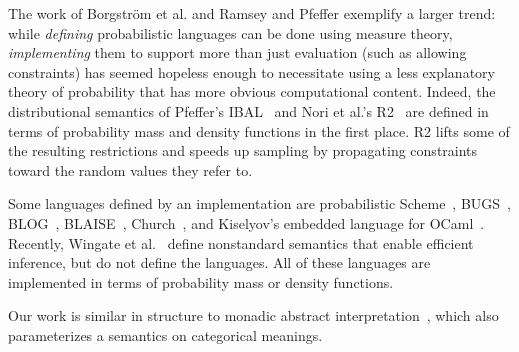 \documentclass{llncs}
\begin{document}
The work of Borgstr\"om et al. and Ramsey and Pfeffer exemplify a larger trend: while \emph{defining} probabilistic languages can be done using measure theory, \emph{implementing} them to support more than just evaluation (such as allowing constraints) has seemed hopeless enough to necessitate using a less explanatory theory of probability that has more obvious computational content.
Indeed, the distributional semantics of Pfeffer's IBAL~\cite{cit:pfeffer-2007chapter-ibal} and Nori et al.'s R2~\cite{cit:nori-2014aaai-preimage} are defined in terms of probability mass and density functions in the first place.
R2 lifts some of the resulting restrictions and speeds up sampling by propagating constraints toward the random values they refer to.

Some languages defined by an implementation are probabilistic Scheme~\cite{cit:koller-1997aaai-bayes-programs-short}, BUGS~\cite{cit:winbugs-language-short}, BLOG~\cite{cit:blog-language-short}, BLAISE~\cite{cit:blaise-language}, Church~\cite{cit:church-language-short}, and Kiselyov's embedded language for OCaml~\cite{cit:kiselyov-2008uai-monolingual}.
Recently, Wingate et al.~\cite{cit:wingate-2011nips-nonstandard} define nonstandard semantics that enable efficient inference, but do not define the languages.
All of these languages are implemented in terms of probability mass or density functions.

Our work is similar in structure to monadic abstract interpretation~\cite{cit:sergey-2013pldi-monadic-abstract}, which also parameterizes a semantics on categorical meanings.
\end{document}
